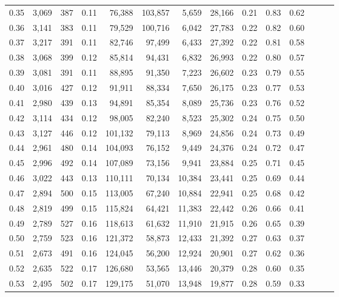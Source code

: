\begin{tabular}{rrrrrrrrrrrrrr}
0.35 &  3,069 &  387 &  0.11 &   76,388 &  103,857 &   5,659 &  28,166 &  0.21 &  0.83 &      0.62 \\
0.36 &  3,141 &  383 &  0.11 &   79,529 &  100,716 &   6,042 &  27,783 &  0.22 &  0.82 &      0.60 \\
0.37 &  3,217 &  391 &  0.11 &   82,746 &   97,499 &   6,433 &  27,392 &  0.22 &  0.81 &      0.58 \\
0.38 &  3,068 &  399 &  0.12 &   85,814 &   94,431 &   6,832 &  26,993 &  0.22 &  0.80 &      0.57 \\
0.39 &  3,081 &  391 &  0.11 &   88,895 &   91,350 &   7,223 &  26,602 &  0.23 &  0.79 &      0.55 \\
0.40 &  3,016 &  427 &  0.12 &   91,911 &   88,334 &   7,650 &  26,175 &  0.23 &  0.77 &      0.53 \\
0.41 &  2,980 &  439 &  0.13 &   94,891 &   85,354 &   8,089 &  25,736 &  0.23 &  0.76 &      0.52 \\
0.42 &  3,114 &  434 &  0.12 &   98,005 &   82,240 &   8,523 &  25,302 &  0.24 &  0.75 &      0.50 \\
0.43 &  3,127 &  446 &  0.12 &  101,132 &   79,113 &   8,969 &  24,856 &  0.24 &  0.73 &      0.49 \\
0.44 &  2,961 &  480 &  0.14 &  104,093 &   76,152 &   9,449 &  24,376 &  0.24 &  0.72 &      0.47 \\
0.45 &  2,996 &  492 &  0.14 &  107,089 &   73,156 &   9,941 &  23,884 &  0.25 &  0.71 &      0.45 \\
0.46 &  3,022 &  443 &  0.13 &  110,111 &   70,134 &  10,384 &  23,441 &  0.25 &  0.69 &      0.44 \\
0.47 &  2,894 &  500 &  0.15 &  113,005 &   67,240 &  10,884 &  22,941 &  0.25 &  0.68 &      0.42 \\
0.48 &  2,819 &  499 &  0.15 &  115,824 &   64,421 &  11,383 &  22,442 &  0.26 &  0.66 &      0.41 \\
0.49 &  2,789 &  527 &  0.16 &  118,613 &   61,632 &  11,910 &  21,915 &  0.26 &  0.65 &      0.39 \\
0.50 &  2,759 &  523 &  0.16 &  121,372 &   58,873 &  12,433 &  21,392 &  0.27 &  0.63 &      0.37 \\
0.51 &  2,673 &  491 &  0.16 &  124,045 &   56,200 &  12,924 &  20,901 &  0.27 &  0.62 &      0.36 \\
0.52 &  2,635 &  522 &  0.17 &  126,680 &   53,565 &  13,446 &  20,379 &  0.28 &  0.60 &      0.35 \\
0.53 &  2,495 &  502 &  0.17 &  129,175 &   51,070 &  13,948 &  19,877 &  0.28 &  0.59 &      0.33 \\

\end{tabular}
